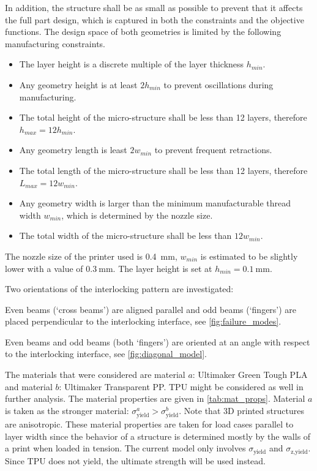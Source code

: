In addition, the structure shall be as small as possible to prevent that it affects the full part design, which is captured in both the constraints and the objective functions.
The design space of both geometries is limited by the following manufacturing constraints.
\begin{itemize}
	\setlength\itemsep{0mm}
	\item The layer height is a discrete multiple of the layer thickness $h_{min}$.
	\item Any geometry height is at least $2 h_{min}$ to prevent oscillations during manufacturing.
	\item The total height of the micro-structure shall be less than 12 layers, therefore $h_{max}=12 h_{min}$.
	\item Any geometry length is least $2w_{min}$ to prevent frequent retractions.
	\item The total length of the micro-structure shall be less than 12 layers, therefore $L_{max} = 12 w_{min}$.
	\item Any geometry width is larger than the minimum manufacturable thread width $w_{min}$, which is determined by the nozzle size.
	\item The total width of the micro-structure shall be less than $12w_{min}$.
\end{itemize}

The nozzle size of the printer used is \SI{0.4}{\milli\meter}, $w_{min}$ is estimated to be slightly lower with a value of $\SI{0.3}{\milli\meter}$.
The layer height is set at $h_{min}=\SI{0.1}{\milli\meter}$.

Two orientations of the interlocking pattern are investigated:
\begin{description}
	\setlength\itemsep{0em}
	\item[Straight] Even beams (`cross beams') are aligned parallel and odd beams (`fingers') are placed perpendicular to the interlocking interface, see \cref{fig:failure_modes}.
	\item[Diagonal] Even beams and odd beams (both `fingers') are oriented at an angle with respect to the interlocking interface, see \cref{fig:diagonal_model}.
\end{description}

The materials that were considered are material $a$: Ultimaker Green Tough PLA and material $b$: Ultimaker Transparent PP. TPU might be considered as well in further analysis. The material properties are given in \cref{tab:mat_props}.
Material $a$ is taken as the stronger material: $\sigma^a_\text{yield} > \sigma^b_\text{yield} $.
Note that 3D printed structures are anisotropic.
These material properties are taken for load cases parallel to layer width since the behavior of a structure is determined mostly by the walls of a print when loaded in tension. 
The current model only involves $\sigma_\text{yield}$ and $\sigma_\text{z,yield}$. Since TPU does not yield, the ultimate strength will be used instead.




